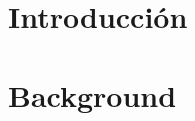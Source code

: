 \documentclass[a4paper,11pt]{book}
\theoremstyle{definition} \newtheorem{axiom}{Axioma}
\theoremstyle{theorem} \newtheorem{teorema}{Teorema}
\begin{document}


\makeatother
\newcommand{\Nat}{\mathbb{N}}
\newcommand{\IM}[1]{\underline{#1}}
\newcommand{\cita}{\textcolor{red}{cita}}
\newcommand{\alert}[1]{\footnote{\textcolor{red}{#1}}}
\newcommand{\red}[1]{\textcolor{red}{#1}}

\newcommand{\mycomment}[1]{\textcolor{blue}{#1}\newline}
\theoremstyle{definition} \newtheorem{definition}{Definici'on}


\newcommand{\defaultAlignment}{center}
\newcommand{\defaultWidth}{12.5cm}
\newcommand{\defaultPosition}{h}
\newenvironment{imagen}{
\let\File\empty
\let\Desc\empty
\let\LabelName\empty
\let\Width\textwidth
\let\Alignment\defaultAlignment
\let\Position\defaultPosition
}{
    \begin{figure}[\Position]
    \begin{\Alignment}
    \texttt{[image: \\File]}
    \caption{\small{\Desc}}
    \label{\LabelName}
    \end{\Alignment}
    \end{figure}

}

\newcommand{\position}[1]{\def\Position{#1}}
\newcommand{\file}[1]{\def\File{#1}}
\newcommand{\desc}[1]{\def\Desc{#1}}
\newcommand{\labelname}[1]{\def\LabelName{#1}}
\newcommand{\width}[1]{\def\Width{#1}}
\newcommand{\alignment}[1]{\def\Alignment{#1}}



\frontmatter

%


%
%
%
%

\setlength{\parskip}{0ex plus 0.5ex minus 0.2ex}
\tableofcontents

\mainmatter
\fancyhead[LO]{\leftmark}


\chapter{Introducci\'on}


\chapter{Background}
\label{cap:background}


\end{document}
